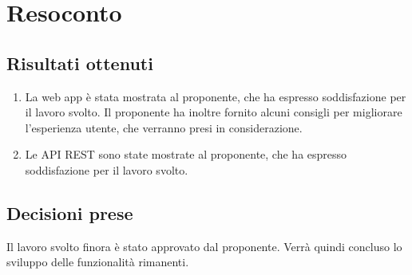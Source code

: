 \section{Resoconto}

\subsection{Risultati ottenuti}

\begin{enumerate}
      \item La web app è stata mostrata al proponente, che ha espresso soddisfazione per il lavoro svolto. Il proponente ha inoltre fornito alcuni consigli per migliorare l'esperienza utente, che verranno presi in considerazione.
      \item Le API REST sono state mostrate al proponente, che ha espresso soddisfazione per il lavoro svolto.
\end{enumerate}

\subsection{Decisioni prese}

Il lavoro svolto finora è stato approvato dal proponente. Verrà quindi concluso lo sviluppo delle funzionalità rimanenti.
